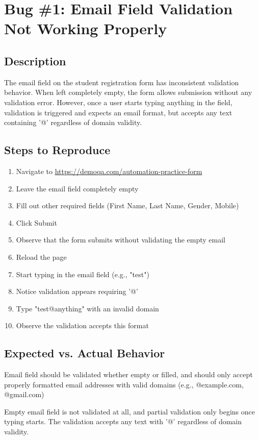 \section{Bug \#1: Email Field Validation Not Working Properly}


\subsection*{Description}
The email field on the student registration form has inconsistent validation behavior. When left completely empty, the form allows submission without any validation error. However, once a user starts typing anything in the field, validation is triggered and expects an email format, but accepts any text containing '@' regardless of domain validity.

\subsection*{Steps to Reproduce}
\begin{enumerate}
    \item Navigate to \url{https://demoqa.com/automation-practice-form}
    \item Leave the email field completely empty
    \item Fill out other required fields (First Name, Last Name, Gender, Mobile)
    \item Click Submit
    \item Observe that the form submits without validating the empty email
    \item Reload the page
    \item Start typing in the email field (e.g., "test")
    \item Notice validation appears requiring '@'
    \item Type "test@anything" with an invalid domain
    \item Observe the validation accepts this format
\end{enumerate}

\subsection*{Expected vs. Actual Behavior}
\begin{tcolorbox}[colback=gray!10, colframe=gray!40, title=Expected Behavior]
Email field should be validated whether empty or filled, and should only accept properly formatted email addresses with valid domains (e.g., @example.com, @gmail.com)
\end{tcolorbox}

\begin{tcolorbox}[colback=gray!10, colframe=gray!40, title=Actual Behavior]
Empty email field is not validated at all, and partial validation only begins once typing starts. The validation accepts any text with '@' regardless of domain validity.
\end{tcolorbox}

